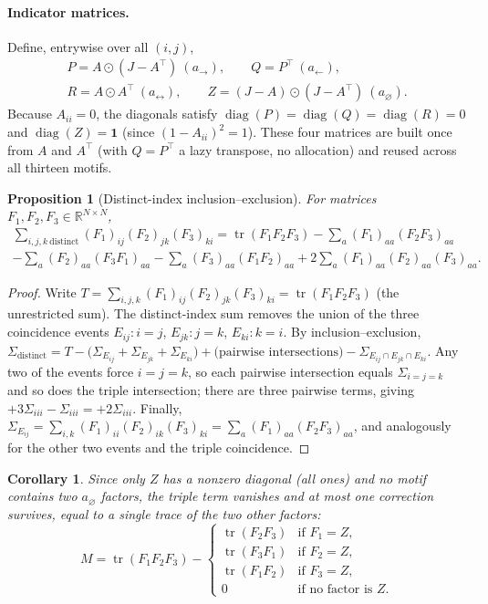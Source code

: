 \documentclass[11pt]{article}
\theoremstyle{plain}
\newtheorem{proposition}{Proposition}
\newtheorem{corollary}{Corollary}
\theoremstyle{definition}
\newcommand{\R}{\mathbb{R}}
\newcommand{\tr}{\operatorname{tr}}
\newcommand{\diag}{\operatorname{diag}}
\newcommand{\had}{\odot} %
\begin{document}
\paragraph{Indicator matrices.} Define, entrywise over all $(i,j)$,
\begin{gather*}
P=A\had(J-A^\top)\ (a_{\to}),\qquad
Q=P^\top\ (a_{\leftarrow}),\\
R=A\had A^\top\ (a_{\leftrightarrow}),\qquad
Z=(J-A)\had(J-A^\top)\ (a_{\varnothing}).
\end{gather*}
Because $A_{ii}=0$, the diagonals satisfy $\diag(P)=\diag(Q)=\diag(R)=0$ and $\diag(Z)=\mathbf 1$
(since $(1-A_{ii})^2=1$). These four matrices are built once from $A$ and $A^\top$ (with $Q=P^\top$ a lazy
transpose, no allocation) and reused across all thirteen motifs.

\begin{proposition}[Distinct-index inclusion--exclusion]\label{prop:motif}
For matrices $F_1,F_2,F_3\in\R^{N\times N}$,
\begin{multline*}
\sum_{i,j,k\ \text{distinct}} (F_1)_{ij}(F_2)_{jk}(F_3)_{ki}
=\tr(F_1F_2F_3)
-\sum_a (F_1)_{aa}(F_2F_3)_{aa}\\
-\sum_a (F_2)_{aa}(F_3F_1)_{aa}
-\sum_a (F_3)_{aa}(F_1F_2)_{aa}
+2\sum_a (F_1)_{aa}(F_2)_{aa}(F_3)_{aa}.
\end{multline*}
\end{proposition}
\begin{proof}
Write $T=\sum_{i,j,k}(F_1)_{ij}(F_2)_{jk}(F_3)_{ki}=\tr(F_1F_2F_3)$ (the unrestricted sum). The distinct-index
sum removes the union of the three coincidence events $E_{ij}\!:i=j$, $E_{jk}\!:j=k$, $E_{ki}\!:k=i$. By
inclusion--exclusion,
$\Sigma_{\text{distinct}}=T-\big(\Sigma_{E_{ij}}+\Sigma_{E_{jk}}+\Sigma_{E_{ki}}\big)+\big(\text{pairwise
intersections}\big)-\Sigma_{E_{ij}\cap E_{jk}\cap E_{ki}}$. Any two of the events force $i=j=k$, so each
pairwise intersection equals $\Sigma_{i=j=k}$ and so does the triple intersection; there are three pairwise
terms, giving $+3\Sigma_{iii}-\Sigma_{iii}=+2\Sigma_{iii}$. Finally,
$\Sigma_{E_{ij}}=\sum_{i,k}(F_1)_{ii}(F_2)_{ik}(F_3)_{ki}=\sum_a (F_1)_{aa}(F_2F_3)_{aa}$, and analogously for
the other two events and the triple coincidence.
\end{proof}

\begin{corollary}\label{cor:motif}
Since only $Z$ has a nonzero diagonal (all ones) and no motif contains two $a_\varnothing$ factors, the triple
term vanishes and at most one correction survives, equal to a single trace of the two \emph{other} factors:
\[
M=\tr(F_1F_2F_3)-
\begin{cases}
\tr(F_2F_3) & \text{if } F_1=Z,\\
\tr(F_3F_1) & \text{if } F_2=Z,\\
\tr(F_1F_2) & \text{if } F_3=Z,\\
0 & \text{if no factor is } Z.
\end{cases}
\]
\end{corollary}
\end{document}
